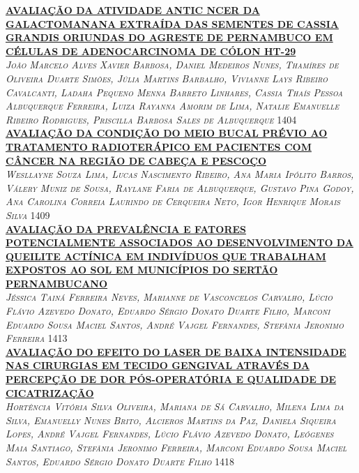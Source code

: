 \noindent \textsc{\hyperlink{trabalhos/251099.pdf.1}{\textbf{AVALIAÇÃO DA ATIVIDADE ANTIC NCER DA GALACTOMANANA EXTRAÍDA DAS SEMENTES DE CASSIA GRANDIS ORIUNDAS DO AGRESTE DE PERNAMBUCO EM CÉLULAS DE ADENOCARCINOMA DE CÓLON HT-29}}}\\ 
\noindent \textsc{\textit{João Marcelo Alves Xavier Barbosa, Daniel Medeiros Nunes, Thamíres de Oliveira Duarte Simões, Júlia Martins Barbalho, Vivianne Lays Ribeiro Cavalcanti, Ladaha Pequeno Menna Barreto Linhares, Cassia Thaís Pessoa Albuquerque Ferreira, Luiza Rayanna Amorim de Lima, Natalie Emanuelle Ribeiro Rodrigues, Priscilla Barbosa Sales de Albuquerque}} \hfill 1404\\ 

\noindent \textsc{\hyperlink{trabalhos/249494.pdf.1}{\textbf{AVALIAÇÃO DA CONDIÇÃO DO MEIO BUCAL PRÉVIO AO TRATAMENTO RADIOTERÁPICO EM PACIENTES COM CÂNCER NA REGIÃO DE CABEÇA E PESCOÇO}}}\\ 
\noindent \textsc{\textit{Wesllayne Souza Lima, Lucas Nascimento Ribeiro, Ana Maria Ipólito Barros, Válery Muniz de Sousa, Raylane Faria de Albuquerque, Gustavo Pina Godoy, Ana Carolina Correia Laurindo de Cerqueira Neto, Igor Henrique Morais Silva}} \hfill 1409\\ 

\noindent \textsc{\hyperlink{trabalhos/250263.pdf.1}{\textbf{AVALIAÇÃO DA PREVALÊNCIA E FATORES POTENCIALMENTE ASSOCIADOS AO DESENVOLVIMENTO DA QUEILITE ACTÍNICA EM INDIVÍDUOS QUE TRABALHAM EXPOSTOS AO SOL EM MUNICÍPIOS DO SERTÃO PERNAMBUCANO}}}\\ 
\noindent \textsc{\textit{Jéssica Tainá Ferreira Neves, Marianne de Vasconcelos Carvalho, Lúcio Flávio Azevedo Donato, Eduardo Sérgio Donato Duarte Filho, Marconi Eduardo Sousa Maciel Santos, André Vajgel Fernandes, Stefânia Jeronimo Ferreira}} \hfill 1413\\ 

\noindent \textsc{\hyperlink{trabalhos/249303.pdf.1}{\textbf{AVALIAÇÃO DO EFEITO DO LASER DE BAIXA INTENSIDADE NAS CIRURGIAS EM TECIDO GENGIVAL ATRAVÉS DA PERCEPÇÃO DE DOR PÓS-OPERATÓRIA E QUALIDADE DE CICATRIZAÇÃO }}}\\ 
\noindent \textsc{\textit{Hortência Vitória Silva Oliveira, Mariana de Sá Carvalho, Milena Lima da Silva, Emanuelly Nunes Brito, Alcieros Martins da Paz, Daniela Siqueira Lopes, André Vajgel Fernandes, Lúcio Flávio Azevedo Donato, Leógenes Maia Santiago, Stefânia Jeronimo Ferreira, Marconi Eduardo Sousa Maciel Santos, Eduardo Sérgio Donato Duarte Filho}} \hfill 1418\\ 

